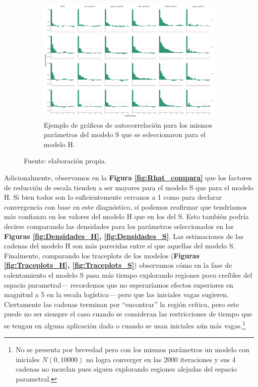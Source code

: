 \begin{figure}[h]
\begin{subfigure}{0.6\textwidth}
	\includegraphics[width = \textwidth]{Figs/Convergencia/Convergencia_AutoCorr_S}
	\caption{Ejemplo de gráficos de autocorrelación para los mismos parámetros del modelo S que se seleccionaron para el modelo H.}
	\label{fig:Autocorr_S}
	\end{subfigure}
	\caption{Fuente: elaboración propia.}
\end{figure} 
 
 Adicionalmente, observamos en la \textbf{Figura \ref{fig:Rhat_compara}} que los factores de reducción de escala tienden a ser mayores para el modelo S que para el modelo H. Si bien todos son lo suficientemente cercanos a 1 como para declarar convergencia con base en este diagnóstico, sí podemos reafirmar que tendríamos más confianza en los valores del modelo H que en los del S. Esto también podría decirse comparando las densidades para los parámetros seleccionados en las \textbf{Figuras  \ref{fig:Densidades_H}, \ref{fig:Densidades_S}}. Las estimaciones de las cadenas del modelo H son más parecidas entre sí que aquellas del modelo S. Finalmente, comparando los traceplots de los modelos (\textbf{Figuras  \ref{fig:Traceplots_H}, \ref{fig:Traceplots_S}}) observamos cómo en la fase de calentamiento el modelo S pasa más tiempo explorando regiones poco creíbles del espacio parametral--- recordemos que no esperaríamos efectos superiores en magnitud a 5 en la escala logística--- pero que las iniciales vagas sugieren. Ciertamente las cadenas terminan por ``encontrar'' la región crítica, pero este puede no ser siempre el caso cuando se consideran las restricciones de tiempo que se tengan en alguna aplicación dada o cuando se usan iniciales aún más vagas.\footnote{No se presenta por brevedad pero con los mismos parámetros un modelo con iniciales $N(0,10000)$ no logra converger en las 2000 iteraciones y sus 4 cadenas no mezclan pues siguen explorando regiones alejadas del espacio parametral.}\\ 
 
